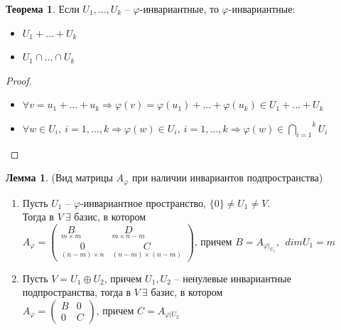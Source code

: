 \documentclass[a4paper, 12pt]{article}
\theoremstyle{definition}
\newtheorem*{theorem}{Теорема}
\newtheorem*{lemma}{Лемма}
\begin{document}
    \begin{theorem}
        Если $U_1,..., U_k$ -- $\varphi$-инвариантные, то $\varphi$-инвариантные:
        \begin{itemize}
            \item $U_1+...+U_k$
            \item $U_1 \cap...\cap U_k$ 
        \end{itemize}        
    \end{theorem}
    \begin{proof}
        \item
        \begin{itemize} 
            \item $\forall v = u_1 +...+ u_k \Longrightarrow 
            \varphi(v) = \varphi(u_1) +...+ \varphi(u_k) \in U_1 +
            ...+U_k$
            \item $\forall w \in U_i,\ i = 1,...,k \Longrightarrow 
            \varphi(w) \in U_i,\ i = 1,...,k \Longrightarrow 
            \varphi(w) \in \overset{k}{\underset{i=1}{\bigcap}} U_i$
        \end{itemize}
        
    \end{proof}
    \begin{lemma}
        (Вид матрицы $A_\varphi$ при наличии инвариантов 
        подпространства)
        \begin{enumerate}
            \item Пусть $U_1$ -- $\varphi$-инвариантное
            пространство, $\{0\} \neq U_1 \neq V$.\\ Тогда
            в $V\ \exists$ базис, в котором\\ $A_\varphi = 
            \begin{pmatrix}
                \underset{m\times m}{B} & \underset{m\times n-m}{D}\\
                \underset{(n-m)\times n}{0} & \underset{(n-m)\times (n-m)}{C} 
            \end{pmatrix} \text{, причем } B = A_{\varphi|_{U_1}},\ \  dimU_1 = m$ 
            \item Пусть $V = U_1 \oplus U_2$, причем $U_1, U_2$ --
            ненулевые инвариантные подпространства, тогда в
            $V\ \exists$ базис, в котором\\ $A_\varphi = 
            \begin{pmatrix}
                B & 0\\
                0 & C 
            \end{pmatrix}$, причем $C = A_{\varphi|U_2}$ 
        \end{enumerate}
    \end{lemma}
\end{document}

